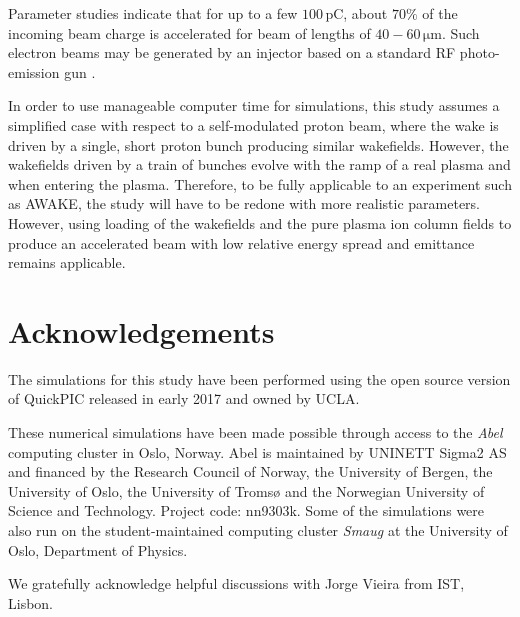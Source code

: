 \documentclass[aps,prstab,reprint,amsmath,amssymb,groupedaddress]{revtex4-1}
\newcommand{\unit}[1]{\,\mathrm{#1}}
\begin{document}
Parameter studies indicate that for up to a few $100\unit{pC}$, about $70\%$ of the incoming beam charge is accelerated
for beam of lengths of $40-60\unit{\mu m}$. Such electron beams may be generated by an injector based on a standard
RF photo-emission gun \cite{doebert:corr}.

In order to use manageable computer time for simulations, this study assumes a simplified case with respect to a
self-modulated proton beam, where the wake is driven by a single, short proton bunch producing similar wakefields.
However, the wakefields driven by a train of bunches evolve with the ramp of a real plasma and when entering the plasma.
Therefore, to be fully applicable to an experiment such as AWAKE, the study will have to be redone with more realistic
parameters. However, using loading of the wakefields and the pure plasma ion column fields to produce an accelerated
beam with low relative energy spread and emittance remains applicable.

\section{Acknowledgements}\label{Ack}

The simulations for this study have been performed using the open source version of QuickPIC released in early 2017
and owned by UCLA.

These numerical simulations have been made possible through access to the \emph{Abel} computing cluster in Oslo, Norway.
Abel is maintained by UNINETT Sigma2 AS and financed by the Research Council of Norway, the University of Bergen, the
University of Oslo, the University of Troms{\o} and the Norwegian University of Science and Technology. Project code:
nn9303k. Some of the simulations were also run on the student-maintained computing cluster \emph{Smaug} at the
University of Oslo, Department of Physics.

We gratefully acknowledge helpful discussions with Jorge Vieira from IST, Lisbon.
\vfill


\end{document}
